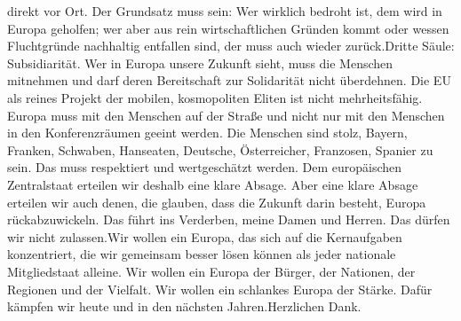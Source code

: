 \documentclass{article}
\begin{document}
direkt vor Ort. Der Grundsatz muss sein: Wer wirklich bedroht ist, dem wird in Europa geholfen; wer aber aus rein wirtschaftlichen Gründen kommt oder wessen Fluchtgründe nachhaltig entfallen sind, der muss auch wieder zurück.Dritte Säule: Subsidiarität. Wer in Europa unsere Zukunft sieht, muss die Menschen mitnehmen und darf deren Bereitschaft zur Solidarität nicht überdehnen. Die EU als reines Projekt der mobilen, kosmopoliten Eliten ist nicht mehrheitsfähig. Europa muss mit den Menschen auf der Straße und nicht nur mit den Menschen in den Konferenzräumen geeint werden. Die Menschen sind stolz, Bayern, Franken, Schwaben, Hanseaten, Deutsche, Österreicher, Franzosen, Spanier zu sein. Das muss respektiert und wertgeschätzt werden. Dem europäischen Zentralstaat erteilen wir deshalb eine klare Absage. Aber eine klare Absage erteilen wir auch denen, die glauben, dass die Zukunft darin besteht, Europa rückabzuwickeln. Das führt ins Verderben, meine Damen und Herren. Das dürfen wir nicht zulassen.Wir wollen ein Europa, das sich auf die Kernaufgaben konzentriert, die wir gemeinsam besser lösen können als jeder nationale Mitgliedstaat alleine. Wir wollen ein Europa der Bürger, der Nationen, der Regionen und der Vielfalt. Wir wollen ein schlankes Europa der Stärke. Dafür kämpfen wir heute und in den nächsten Jahren.Herzlichen Dank.
\end{document}
